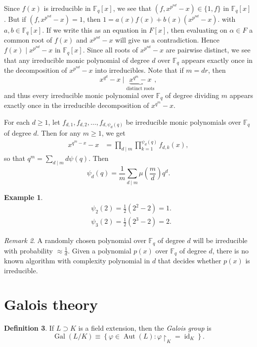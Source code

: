 \documentclass[10pt,letterpaper,cm]{nupset}
\theoremstyle{definition}
\newtheorem{definition}{Definition}[subsection]
\newtheorem{exmp}[definition]{Example}
\theoremstyle{theorem}
\theoremstyle{remark}
\newtheorem{remark}[definition]{Remark}
\newcommand{\F}{\mathbb F}
\newcommand{\1}{\mathbf{1}}
\newcommand{\0}{\vec 0}
\DeclareMathOperator{\id}{id}
\DeclareMathOperator{\gal}{Gal}
\DeclareMathOperator{\aut}{Aut}
\begin{document}
Since $f(x)$ is irreducible in $\F_q[x]$, we see that $\left(f, x^{p^{nd}}-x\right) \in \{1,f\}$ in $\F_q[x]$. But if $\left(f, x^{p^{nd}}-x\right)=1$, then $1 = a(x)f(x) + b(x)(x^{p^{nd}}-x)$.  with $a, b\in \F_q[x]$. If we write this as an equation in $F[x]$, then evaluating on $\alpha \in F$ a common root of $f(x)$ and $x^{p^{nd}}-x$ will give us a contradiction. Hence $f(x) \mid x^{p^{nd}}-x$ in $\F_q[x]$. Since all roots of $x^{p^{nd}}-x$ are pairwise distinct, we see that any irreducible monic polynomial of degree $d$ over $\F_q$ appears exactly once in the decomposition of $x^{p^{nd}}-x$ into irreducibles. Note that if $m =dr$, then $$x^{q^d}-x \mid \underbrace{x^{q^m} -x}_{\text{distinct roots}},$$ and thus every irreducible monic polynomial over $\F_q$ of degree dividing $m$ appears exactly once in the irreducible decomposition of $x^{q^m}-x$. 

For each $d\geq 1$, let $f_{d,1}, f_{d,2}, \ldots, f_{d, \psi_d(q)}$ be irreducible monic polynomials over $\F_q$ of degree $d$. Then for any $m\geq 1$, we get
\begin{align*}
x^{q^m -x}-x & = \prod_{d\mid m} \prod_{k=1}^{\psi_d(q)}f_{d,k}(x),
\end{align*}
so that $q^m = \sum_{d\mid m} d\psi(q)$. Then $$ \psi_d(q) = \frac{1}{m}\sum_{d\mid m}\mu\left(\frac{m}{d}\right)q^d  .$$ 


\begin{exmp}
\begin{align*}
& \psi_2(2) = \frac{1}{2}(2^2-2)=1.
\\ &  \psi_3(2) = \frac{1}{2}(2^3 -2) =2.
\end{align*}
\end{exmp}

\begin{remark}
A randomly chosen polynomial over $\F_q$ of degree $d$ will be irreducible with probability $\approx \frac{1}{d}$. Given a polynomial $p(x)$ over $\F_q$ of degree $d$, there is no known algorithm with complexity polynomial in $d$ that decides whether $p(x)$  is irreducible. 
\end{remark}

\section{Galois theory}

\begin{definition}
If $L \supset K$ is a field extension, then the \textit{Galois group} is $$\gal(L/K) \equiv \left\{\varphi \in \aut(L) : \varphi\restriction_K = \id_K\right\}.    $$
\end{definition}
\end{document}
